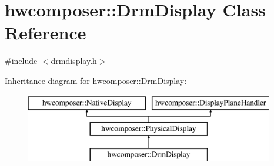 \hypertarget{classhwcomposer_1_1DrmDisplay}{}\section{hwcomposer\+:\+:Drm\+Display Class Reference}
\label{classhwcomposer_1_1DrmDisplay}


{\ttfamily \#include $<$drmdisplay.\+h$>$}

Inheritance diagram for hwcomposer\+:\+:Drm\+Display\+:\begin{figure}[H]
\begin{center}
\leavevmode
\includegraphics[height=3.000000cm]{classhwcomposer_1_1DrmDisplay}
\end{center}
\end{figure}

